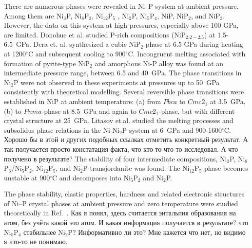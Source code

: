 \documentclass[twoside,twocolumn,9pt]{article}
\begin{document}
There are numerous phases were revealed in Ni--P system at ambient pressure. 
Among them are Ni$_3$P, Ni$_8$P$_3$, Ni$_{12}$P$_5$ , Ni$_2$P, Ni$_5$P$_4$, NiP, NiP$_2$, and NiP$_3$. 
However, the data on this system at high-pressures, especially above 100 GPa, are limited.
Donohue et al.\cite{Donohue-1968} studied P-rich compositions (NiP$_{2.2-2.5}$) at 1.5-6.5~GPa. 
Dera et. al.\cite{Dera-2009-JGR} synthesized a cubic NiP$_2$ phase at 6.5 GPa during heating at 1200$^\circ$C and subsequent cooling to 900$^\circ$C. 
Incongruent melting associated with formation of pyrite-type NiP$_2$ and amorphous Ni-P alloy was found at an intermediate pressure range, between 6.5 and 40~GPa.
The phase transitions in Ni$_2$P were not observed in these experiments at pressures up to 50~GPa consistently with theoretical modelling.\cite{Nisar-2010-EPSL}
Several reversible phase transitions were established in NiP at ambient temperature: (a) from $Pbca$ to $Cmc2_1$ at 3.5~GPa, (b) to $Pnma$-phase at 8.5~GPa and again to $Cmc2_1$-phase, but with different crystal structure at 25~GPa.\cite{Dera-2011-JSSC, Dera2013-PCM}
Litasov et.al. studied the melting processes and subsolidus phase relations in the Ni-Ni$_2$P system at 6~GPa and 900-1600$^\circ$C.\cite{Litasov-2019-HPR-NiP} 
Хорошо бы в этой и других подобных ссылках отметить конкретный результат. А так получается просто констатация факта, что кто-то что-то исследовал. А что получено в результате?
The stability of four intermediate compositions, Ni$_3$P, Ni$_8$P$_3$/Ni$_5$P$_2$, Ni$_{12}$P$_5$, and Ni$_2$P transjordanite was found. 
The Ni$_{12}$P$_5$ phase becomes unstable at 900$^\circ$C and decomposes into Ni$_5$P$_2$ and Ni$_2$P. 

The phase stability, elastic properties, hardness and related electronic structures of Ni--P crystal phases at ambient pressure and zero temperature were studied theoretically in Ref.~\cite{Chen-2016-PhaseTrans, Zhao2011-CALPHAD}. 
{}
Как я понял, здесь считается энтальпия образования на атом, без учёта какой это атом. И какая информация получается в результате? что Ni$_5$P$_4$ стабильнее Ni$_2$P? Информативно ли это? Мне кажется что нет, но видимо я что-то не понимаю.
\end{document}
